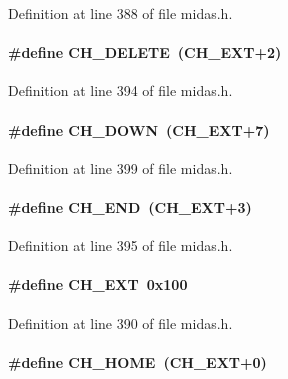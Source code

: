 Definition at line 388 of file midas.h.
\paragraph[{CH\_\-DELETE}]{\setlength{\rightskip}{0pt plus 5cm}\#define CH\_\-DELETE~(CH\_\-EXT+2)}\hfill\label{group__midasincludecode_ga54ec10cd2edbd1cc5ce7ab5bbeabfaf6}


Definition at line 394 of file midas.h.
\paragraph[{CH\_\-DOWN}]{\setlength{\rightskip}{0pt plus 5cm}\#define CH\_\-DOWN~(CH\_\-EXT+7)}\hfill\label{group__midasincludecode_ga30a57a67b1868bd34f9099200cfc92d5}


Definition at line 399 of file midas.h.
\paragraph[{CH\_\-END}]{\setlength{\rightskip}{0pt plus 5cm}\#define CH\_\-END~(CH\_\-EXT+3)}\hfill\label{group__midasincludecode_ga222833d9c50a96e57bd29b077f2eb512}


Definition at line 395 of file midas.h.
\paragraph[{CH\_\-EXT}]{\setlength{\rightskip}{0pt plus 5cm}\#define CH\_\-EXT~0x100}\hfill\label{group__midasincludecode_ga6c4eb2b721d9cd830766a5cad9fb798e}


Definition at line 390 of file midas.h.
\paragraph[{CH\_\-HOME}]{\setlength{\rightskip}{0pt plus 5cm}\#define CH\_\-HOME~(CH\_\-EXT+0)}\hfill\label{group__midasincludecode_gac9bfaae94eccb5a973dd128bdeec953e}


